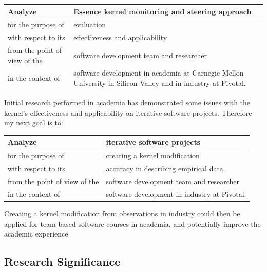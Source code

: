 \documentclass[preprint,12pt,3p]{elsarticle}
\begin{document}
\begin{table}[H]
\centering
\begin{tabular}{|p{2.00in}|p{4.10in}|}
\hline
Analyze & Essence kernel monitoring and steering approach \\ \hline
for the purpose of & evaluation \\ \hline
with respect to its & effectiveness and applicability \\ \hline
from the point of view of the & software development team and researcher \\ \hline
in the context of & software development in academia at Carnegie Mellon University in Silicon Valley and in industry at Pivotal. \\
\hline
\end{tabular}
\end{table}

Initial research performed in academia has demonstrated some issues with the kernel's effectiveness and applicability on iterative software projects. Therefore my next goal is to:

\begin{table}[H]
\centering
\begin{tabular}{|p{2.00in}|p{4.10in}|}
\hline
Analyze & iterative software projects  \\ \hline
for the purpose of & creating a kernel modification  \\ \hline
with respect to its & accuracy in describing empirical data \\ \hline
from the point of view of the & software development team and researcher \\ \hline
in the context of & software development in industry at Pivotal. \\
\hline
\end{tabular}
\end{table}

Creating a kernel modification from observations in industry could then be applied for team-based software courses in academia, and potentially improve the academic experience.

\subsection{Research Significance}
\end{document}
